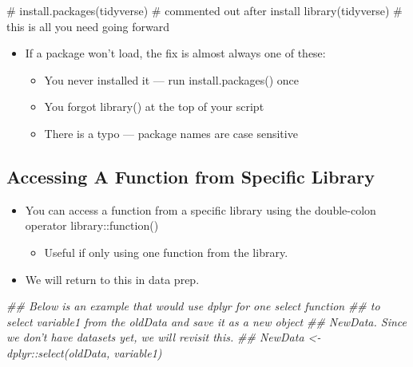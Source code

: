 \documentclass[
  letterpaper,
  DIV=11,
  numbers=noendperiod]{scrreprt}
\newenvironment{Shaded}{\begin{snugshade}}{\end{snugshade}}
\newcommand{\CommentTok}[1]{\textcolor[rgb]{0.37,0.37,0.37}{#1}}
\newcommand{\DocumentationTok}[1]{\textcolor[rgb]{0.37,0.37,0.37}{\textit{#1}}}
\newcommand{\FunctionTok}[1]{\textcolor[rgb]{0.28,0.35,0.67}{#1}}
\newcommand{\NormalTok}[1]{\textcolor[rgb]{0.00,0.23,0.31}{#1}}
\providecommand{\tightlist}{%
  \setlength{\itemsep}{0pt}\setlength{\parskip}{0pt}}\usepackage{longtable,booktabs,array}
\begin{document}
\begin{Shaded}
\begin{Highlighting}[]
\CommentTok{\# install.packages(\textquotesingle{}tidyverse\textquotesingle{}) \# commented out after install}
\FunctionTok{library}\NormalTok{(tidyverse)  }\CommentTok{\# this is all you need going forward}
\end{Highlighting}
\end{Shaded}

\begin{itemize}
\tightlist
\item
  If a package won't load, the fix is almost always one of these:

  \begin{itemize}
  \tightlist
  \item
    You never installed it --- run install.packages() once
  \item
    You forgot library() at the top of your script
  \item
    There is a typo --- package names are case sensitive
  \end{itemize}
\end{itemize}

\subsection{Accessing A Function from Specific
Library}\label{accessing-a-function-from-specific-library}

\begin{itemize}
\tightlist
\item
  You can access a function from a specific library using the
  double-colon operator library::function()

  \begin{itemize}
  \tightlist
  \item
    Useful if only using one function from the library.
  \end{itemize}
\item
  We will return to this in data prep.
\end{itemize}

\begin{Shaded}
\begin{Highlighting}[]
\DocumentationTok{\#\# Below is an example that would use dplyr for one select function}
\DocumentationTok{\#\# to select variable1 from the oldData and save it as a new object}
\DocumentationTok{\#\# NewData. Since we don’t have datasets yet, we will revisit this.}
\DocumentationTok{\#\# NewData \textless{}{-} dplyr::select(oldData, variable1)}
\end{Highlighting}
\end{Shaded}
\end{document}
